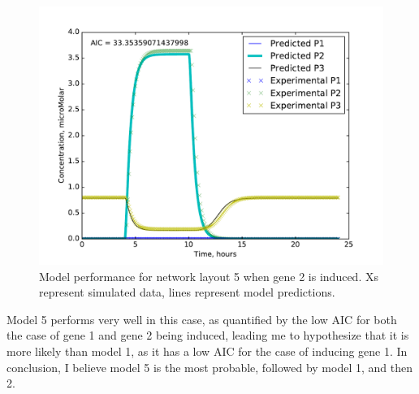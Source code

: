 \documentclass{article}
\begin{document}
\begin{figure}[h!]
\includegraphics[width=12cm]{../Problem3/figures/postNMPlotLayout5Gene2}
\caption{Model performance for network layout 5 when gene 2 is induced. Xs represent simulated data, lines represent model predictions.}
\label{fig:P3Layout5Induce2}
\end{figure}

Model 5 performs very well in this case, as quantified by the low AIC for both the case of gene 1 and gene 2 being induced, leading me to hypothesize that it is more likely than model 1, as it has a low AIC for the case of inducing gene 1. In conclusion, I believe model 5 is the most probable, followed by model 1, and then 2.
\end{document}
